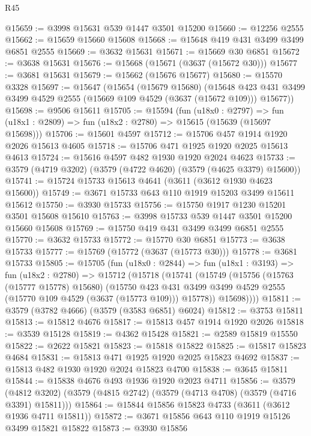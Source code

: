 \begin{lexlean}{R45}
\begin{coremodule}
@15659 := @3998 @15631 @539 @1447 @3501 @15200
@15660 := @12256 @2555
@15662 := @15659 @15660 @15608
@15668 := @15648 @419 @431 @3499 @3499 @6851 @2555
@15669 := @3632 @15631
@15671 := @15669 @30 @6851
@15672 := @3638 @15631
@15676 := @15668 (@15671 (@3637 (@15672 @30)))
@15677 := @3681 @15631
@15679 := @15662 (@15676 @15677)
@15680 := @15570 @3328
@15697 := @15647
    (@15654
      (@15679 @15680)
      (@15648 @423 @431 @3499 @3499 @4529 @2555 (@15669 @109 @4529 (@3637 (@15672 @109))) @15677))
@15698 := @9506 @15611
@15705 := @15594
    (fun (u18x0 : @2797) =>
    fun (u18x1 : @2809) => fun (u18x2 : @2780) => @15615 (@15639 (@15697 @15698)))
@15706 := @15601 @4597
@15712 := @15706 @457 @1914 @1920 @2026 @15613 @4605
@15718 := @15706 @471 @1925 @1920 @2025 @15613 @4613
@15724 := @15616 @4597 @482 @1930 @1920 @2024 @4623
@15733 := @3579 (@4719 @3202) (@3579 (@4722 @4620) (@3579 (@4625 @3379) @15600))
@15741 := @15724 @15733 @15613 @4641 (@3611 (@3612 @1930 @4623 @15600))
@15749 := @3671 @15733 @643 @110 @1919 @15203 @3499 @15611 @15612
@15750 := @3930 @15733
@15756 := @15750 @1917 @1230 @15201 @3501 @15608 @15610
@15763 := @3998 @15733 @539 @1447 @3501 @15200 @15660 @15608
@15769 := @15750 @419 @431 @3499 @3499 @6851 @2555
@15770 := @3632 @15733
@15772 := @15770 @30 @6851
@15773 := @3638 @15733
@15777 := @15769 (@15772 (@3637 (@15773 @30)))
@15778 := @3681 @15733
@15805 := @15705
    (fun (u18x0 : @2844) =>
    fun (u18x1 : @3193) =>
    fun (u18x2 : @2780) =>
    @15712
      (@15718
        (@15741
          (@15749
            (@15756
              (@15763 (@15777 @15778) @15680)
              (@15750
                @423
                @431
                @3499
                @3499
                @4529
                @2555
                (@15770 @109 @4529 (@3637 (@15773 @109)))
                @15778))
            @15698))))
@15811 := @3579 (@3782 @4666) (@3579 (@3583 @6851) @6024)
@15812 := @3753 @15811
@15813 := @15812 @4676
@15817 := @15813 @457 @1914 @1920 @2026
@15818 := @3539 @15128
@15819 := @4362 @15428
@15821 := @2589 @15819 @15550
@15822 := @2622 @15821
@15823 := @15818 @15822
@15825 := @15817 @15823 @4684
@15831 := @15813 @471 @1925 @1920 @2025 @15823 @4692
@15837 := @15813 @482 @1930 @1920 @2024 @15823 @4700
@15838 := @3645 @15811
@15844 := @15838 @4676 @493 @1936 @1920 @2023 @4711
@15856 := @3579
    (@4812 @3202)
    (@3579 (@4815 @2742) (@3579 (@4713 @4708) (@3579 (@4716 @3391) @15811)))
@15864 := @15844 @15856 @15823 @4733 (@3611 (@3612 @1936 @4711 @15811))
@15872 := @3671 @15856 @643 @110 @1919 @15126 @3499 @15821 @15822
@15873 := @3930 @15856

\end{coremodule}
\end{lexlean}
